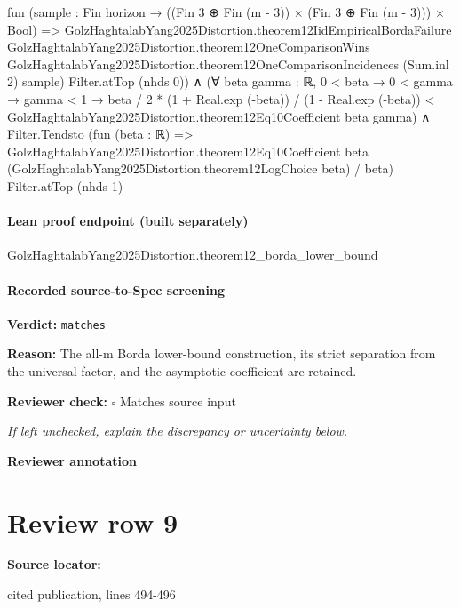 \documentclass[10pt]{article}
\newcommand{\reviewerbox}{%
  \par\noindent\fbox{\parbox{0.96\linewidth}{\rule{0pt}{0.38in}}}\par
}
\newcommand{\reviewmatch}[1]{%
  \par\noindent\textbf{Reviewer check:} $\square$\; #1\par
  \noindent\emph{If left unchecked, explain the discrepancy or uncertainty below.}\par
}
\begin{document}
\begin{ReviewVerbatim}
                            fun (sample : Fin horizon → ((Fin 3 ⊕ Fin (m - 3)) × (Fin 3 ⊕ Fin (m - 3))) × Bool) =>
                            GolzHaghtalabYang2025Distortion.theorem12IidEmpiricalBordaFailure
                              GolzHaghtalabYang2025Distortion.theorem12OneComparisonWins
                              GolzHaghtalabYang2025Distortion.theorem12OneComparisonIncidences (Sum.inl 2) sample)
                        Filter.atTop (nhds 0)) ∧
  (∀ {beta gamma : ℝ},
      0 < beta →
        0 < gamma →
          gamma < 1 →
            beta / 2 * (1 + Real.exp (-beta)) / (1 - Real.exp (-beta)) <
              GolzHaghtalabYang2025Distortion.theorem12Eq10Coefficient beta gamma) ∧
    Filter.Tendsto
      (fun (beta : ℝ) =>
        GolzHaghtalabYang2025Distortion.theorem12Eq10Coefficient beta
            (GolzHaghtalabYang2025Distortion.theorem12LogChoice beta) /
          beta)
      Filter.atTop (nhds 1)
\end{ReviewVerbatim}

\paragraph{Lean proof endpoint (built separately)}\begin{ReviewVerbatim}
GolzHaghtalabYang2025Distortion.theorem12_borda_lower_bound
\end{ReviewVerbatim}

\paragraph{Recorded source-to-Spec screening}
\textbf{Verdict:} \texttt{matches}
\\
{\raggedright
\textbf{Reason:} The all-\allowbreak{}m Borda lower-\allowbreak{}bound construction, its strict separation from the universal factor, and the asymptotic coefficient are retained.\allowbreak{}
\par}
\reviewmatch{Matches source input}
\noindent\textbf{Reviewer annotation}\par
\reviewerbox
\clearpage
\hypertarget{source-claim-b1ccdc13d898700c}{}
\section*{Review row 9}
\textbf{Source locator:} {\footnotesize\raggedright cited publication, lines 494-\allowbreak{}496\par}
\end{document}
